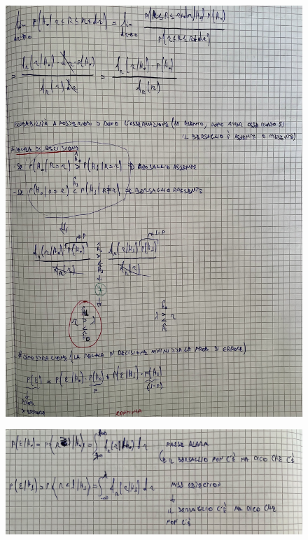 \documentclass{article}
\begin{document}
\begin{figure}[ht]
\centering
\includegraphics[scale=0.10]{ese/24a.jpeg}
\end{figure} 
\begin{figure}[ht]
\centering
\includegraphics[scale=0.10]{ese/24b.jpeg}
\end{figure} 
\end{document}
